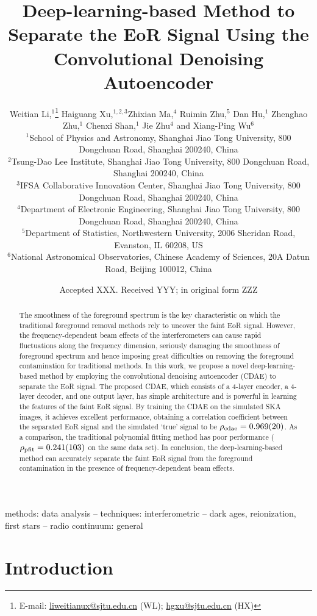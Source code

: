 \documentclass[letters,a4paper,fleqn,usenatbib]{mnras}
\title[EoR Separation with CDAE]{%
  Deep-learning-based Method to Separate the EoR Signal
  Using the Convolutional Denoising Autoencoder
}
\author[Li~et~al.]{%
Weitian Li,$^{1}$\thanks{E-mail:
  \href{mailto:liweitianux@sjtu.edu.cn}{liweitianux@sjtu.edu.cn} (WL);
  \href{mailto:hgxu@sjtu.edu.cn}{hgxu@sjtu.edu.cn} (HX)}
Haiguang Xu,$^{1,2,3}$\footnotemark[1]
Zhixian Ma,$^{4}$
Ruimin Zhu,$^{5}$
Dan Hu,$^{1}$
Zhenghao Zhu,$^{1}$
\newauthor
Chenxi Shan,$^{1}$
Jie Zhu$^{4}$
and
Xiang-Ping Wu$^{6}$
\\
$^{1}${School of Physics and Astronomy,
  Shanghai Jiao Tong University,
  800 Dongchuan Road, Shanghai 200240, China} \\
$^{2}${Tsung-Dao Lee Institute,
  Shanghai Jiao Tong University,
  800 Dongchuan Road, Shanghai 200240, China} \\
$^{3}${IFSA Collaborative Innovation Center,
  Shanghai Jiao Tong University,
  800 Dongchuan Road, Shanghai 200240, China} \\
$^{4}${Department of Electronic Engineering,
  Shanghai Jiao Tong University,
  800 Dongchuan Road, Shanghai 200240, China} \\
$^{5}${Department of Statistics,
  Northwestern University,
  2006 Sheridan Road, Evanston, IL 60208, US} \\
$^{6}${National Astronomical Observatories,
  Chinese Academy of Sciences,
  20A Datun Road, Beijing 100012, China}
}
\date{Accepted XXX. Received YYY; in original form ZZZ}
\newcommand{\R}[1]{\mathrm{#1}}
\begin{document}
\label{firstpage}
\pagerange{\pageref{firstpage}--\pageref{lastpage}}
\maketitle

%
%
\begin{abstract}
The smoothness of the foreground spectrum is the key characteristic
on which the traditional foreground removal methods rely to uncover
the faint EoR signal.
However, the frequency-dependent beam effects of the interferometers
can cause rapid fluctuations along the frequency dimension, seriously
damaging the smoothness of foreground spectrum and hence imposing
great difficulties on removing the foreground contamination for
traditional methods.
In this work, we propose a novel deep-learning-based method by employing
the convolutional denoising autoencoder (CDAE) to separate the EoR signal.
The proposed CDAE, which consists of a 4-layer encoder, a 4-layer
decoder, and one output layer, has simple architecture and is powerful
in learning the features of the faint EoR signal.
By training the CDAE on the simulated SKA images, it achieves excellent
performance, obtaining a correlation coefficient between
the separated EoR signal and the simulated `true' signal to be
$\rho_{\R{cdae}} = \num{0.969 +- 0.020}$.
As a comparison, the traditional polynomial fitting method has
poor performance
($\rho_{\R{pfit}} = \num{0.241 +- 0.103}$ on the same data set).
In conclusion, the deep-learning-based method can accurately separate
the faint EoR signal from the foreground contamination in the presence
of frequency-dependent beam effects.
\end{abstract}

\begin{keywords}
methods: data analysis --
techniques: interferometric --
dark ages, reionization, first stars --
radio continuum: general
\end{keywords}



\section{Introduction}
\label{sec:intro}
\end{document}
